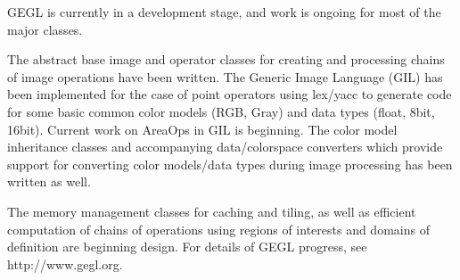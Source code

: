 GEGL is currently in a development stage, and work is ongoing for most of the
major classes.

The abstract base image and operator classes for creating and processing chains
of image operations have been written. The Generic Image Language (GIL) has
been implemented for the case of point operators using lex/yacc to generate
code for some basic common color models (RGB, Gray) and data types (float,
    8bit, 16bit).  Current work on AreaOps in GIL is beginning. The color model
inheritance classes and accompanying data/colorspace converters which provide
support for converting color models/data types during image processing has been
written as well.

The memory management classes for caching and tiling, as well as efficient
computation of chains of operations using regions of interests and domains of
definition are beginning design. For details of GEGL progress, see
http://www.gegl.org.
